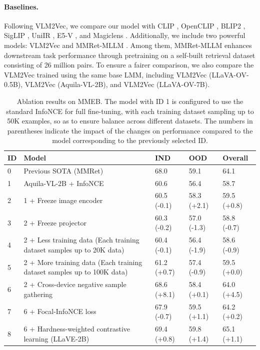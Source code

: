 \documentclass[11pt]{article}
\begin{document}
\paragraph{Baselines.} 
Following VLM2Vec, we compare our model with CLIP \cite{CLIP}, OpenCLIP \cite{DBLP:conf/cvpr/ChertiBWWIGSSJ23}, BLIP2 \cite{BLIP2}, SigLIP \cite{SigLIP}, UniIR \cite{Uniir}, E5-V \cite{E5-V}, and Magiclens \cite{Magiclens}. Additionally, we include two powerful models: VLM2Vec \cite{VLM2Vec} and MMRet-MLLM \cite{MMRet}. Among them, MMRet-MLLM enhances downstream task performance through pretraining on a self-built retrieval dataset consisting of 26 million pairs. To ensure a fairer comparison, we also compare the VLM2Vec trained using the same base LMM, including VLM2Vec (LLaVA-OV-0.5B), VLM2Vec (Aquila-VL-2B), and VLM2Vec (LLaVA-OV-7B).


\begin{table}[]
\centering
\setlength\tabcolsep{11pt}%
\renewcommand\arraystretch{1.2}
\small
\fontsize{8pt}{8pt}\selectfont
\begin{tabular}{lllll}
\toprule
ID & Model                                                                  & IND  & OOD  & Overall \\ \midrule
0  & Previous SOTA (MMRet)                                                  & 68.0 & 59.1 & 64.1    \\ \midrule
1  & Aquila-VL-2B + InfoNCE                                                 & 60.6 & 56.4 & 58.7    \\ \midrule
2  & 1 + Freeze image encoder                                                & 60.5 (-0.1) & 58.3 (+2.1) & 59.5 (+0.8)    \\
3  & 2 + Freeze projector                                                    & 60.3 (-0.2) & 57.0 (-1.3) & 58.8 (-0.7)   \\ \midrule
4  & 2 + Less training data (Each training dataset samples up to 20K data)  & 60.4 (-0.1) & 56.4 (-1.9) & 58.6 (-0.9)   \\
5  & 2 + More training data (Each training dataset samples up to 100K data) & 61.2 (+0.7) & 57.4 (-0.9) & 59.5 (+0.0)   \\ \midrule
6  & 2 + Cross-device negative sample gathering                                & 68.6 (+8.1) & 58.4 (+0.1) & 64.0 (+4.5)   \\
7  & 6 + Focal-InfoNCE loss \cite{DBLP:conf/emnlp/HouL23}                 & 67.9 (-0.7) & 59.5 (+1.1) & 64.2 (+0.2)   \\
8  & 6 + Hardness-weighted contrastive learning (LLaVE-2B)                  & 69.4 (+0.8) & 59.8 (+1.4) & 65.1 (+1.1)   \\ \bottomrule
\end{tabular}
\vspace{-0.2cm}
\caption{Ablation results on MMEB. The model with ID 1 is configured to use the standard InfoNCE for full fine-tuning, with each training dataset sampling up to 50K examples, so as to ensure balance across different datasets. The numbers in parentheses indicate the impact of the changes on performance compared to the model corresponding to the previously selected ID.}
\label{tab:ablation}
\end{table}
\end{document}
